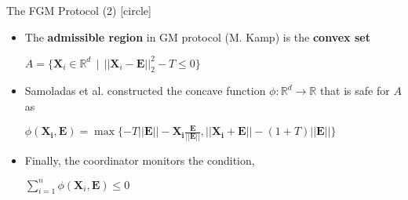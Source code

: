 \begin{frame}{The FGM Protocol (2)}
    [circle]
    \begin{itemize}
        \item{The \textbf{admissible region} in GM protocol (M. Kamp) is the \textbf{convex set}
        \newline
        \begin{center}
            $A=\{\pmb{X}_i\in\mathbb{R}^d\:\:|\:\:||\pmb{X}_i-\pmb{E}||_2^2 - T \leq 0\}$
        \end{center}
        }
        \vspace{0.4cm}
        \item{Samoladas et al. constructed the concave function $\phi:\mathbb{R}^d\rightarrow\mathbb{R}$ that is safe for $A$ as
        \newline
        \begin{center}
            $\phi(\pmb{X_i},\pmb{E}) = \max\{-T||\pmb{E}|| - \pmb{X_i}\frac{\pmb{E}}{\pmb{||E||}}, ||\pmb{X_i}+\pmb{E}|| - (1+T)||\pmb{E}||\}$
        \end{center}
        }
        \vspace{0.4cm}
        \item{Finally, the coordinator monitors the condition,
        \newline
        \begin{center}
            $\sum_{i=1}^n\phi(\pmb{X}_i,\pmb{E}) \leq 0$
        \end{center}
        }
    \end{itemize}
\end{frame}

